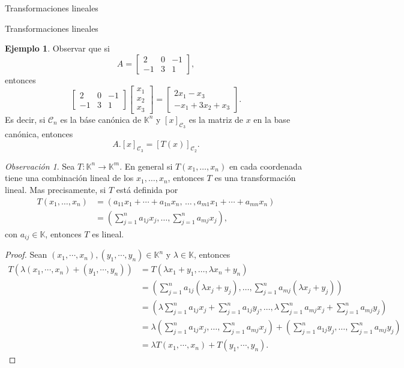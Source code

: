 \documentclass[a4paper,12pt,twoside,spanish]{amsbook}
\theoremstyle{definition}
\newtheorem{ejemplo}{Ejemplo}[section]
\theoremstyle{remark}
\newtheorem{obs}{Observaci\'on}[section]
\newcommand{\K}{\mathbb K}
\begin{document}
\begin{chapter}{Transformaciones lineales}
\begin{section}{Transformaciones lineales}
\begin{ejemplo}
			Observar que si 
			$$
			 A = \begin{bmatrix}
			 2&0&-1 \\ -1&3&1
			 \end{bmatrix},
			$$
			entonces
			$$
			\begin{bmatrix}
			2&0&-1 \\ -1&3&1
			\end{bmatrix} 
			\begin{bmatrix}
			x_1\\x_2\\x_3
			\end{bmatrix} =
			\begin{bmatrix}
			2x_1 - x_3 \\ -x_1+3x_2+x_3
			\end{bmatrix}.
			$$
			Es decir,  si $\mathcal C_n$  es la báse canónica de $\K^n$ y $[x]_{\mathcal C_3}$ es la matriz de $x$ en la base canónica,  entonces 
			$$
			A.[x]_{\mathcal C_3} = [T(x)]_{\mathcal C_2}.
			$$ 
			\end{ejemplo}
		
			\begin{obs}\label{obs-tl-1.5} 	Sea $T: \K^n \to \K^m$. En  general si $T(x_1,\ldots,x_n)$ en cada coordenada tiene una combinación lineal de los $x_1,\ldots,x_n$,  entonces $T$ es una transformación lineal. Mas precisamente, si $T$ está definida por
				\begin{align*}
				T(x_1,\ldots,x_n) &= (a_{11}x_1+\cdots + a_{1n}x_n,\, \ldots\,,a_{m1}x_1+\cdots + a_{mn}x_n )\\
				&=(\sum_{j=1}^n a_{1j} x_j,\ldots,\sum_{j=1}^n a_{mj} x_j),
				\end{align*}
				con $a_{ij} \in \K$, entonces $T$  es lineal. 
			\begin{proof}
				Sean $(x_1,\cdots,x_n), (y_1,\cdots,y_n) \in \K^n$ y $\lambda \in \K$,  entonces
				\begin{align*}
				T(\lambda(x_1,\cdots,x_n)+ (y_1,\cdots,y_n)) &= T(\lambda x_1+y_1,\ldots,\lambda x_n+y_n) \\
				&= (\sum_{j=1}^n a_{1j} (\lambda x_j+y_j),\ldots,\sum_{j=1}^n a_{mj} (\lambda x_j+y_j)) \\
				&= (\lambda\sum_{j=1}^n a_{1j} x_j+\sum_{j=1}^n a_{1j} y_j,\ldots,\lambda\sum_{j=1}^n a_{mj} x_j+\sum_{j=1}^n a_{mj} y_j) \\
				&= \lambda(\sum_{j=1}^n a_{1j} x_j,\ldots,\sum_{j=1}^n a_{mj} x_j) +(\sum_{j=1}^n a_{1j} y_j,\ldots,\sum_{j=1}^n a_{mj} y_j) \\
				& =\lambda T(x_1,\cdots,x_n)+ T(y_1,\cdots,y_n).
				\end{align*}
			\end{proof}
			\end{obs}
			

\end{section}
\end{chapter}
\end{document}
